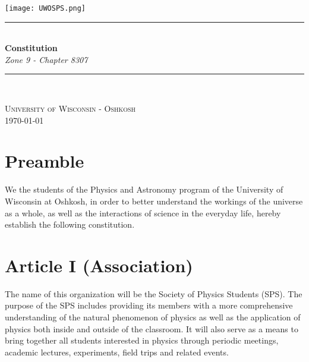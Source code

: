 \documentclass[12pt,a4paper]{article}
\newcommand{\HRule}{\rule{\linewidth}{0.5mm}}
\begin{document}
\setcounter{secnumdepth}{-6}
\begin{titlepage}
\begin{center}

\texttt{[image: UWOSPS.png]}


\HRule \\[0.4cm]
{ \LARGE 
  \textbf{Constitution}\\[0.4cm]
  \emph{Zone 9 - Chapter 8307}\\[0.4cm]
}
\HRule \\[1.5cm]


\vfill


\textsc{\large University of Wisconsin - Oshkosh}\\[0.4cm]


{\large \today}
 
\end{center}
\end{titlepage}


\tableofcontents
{}
\newpage
\setcounter{page}{1}

\section{Preamble}
We the students of the Physics and Astronomy program of the University of Wisconsin at Oshkosh, in order to better understand the workings of the universe as a whole, as well as the interactions of science in the everyday life, hereby establish the following constitution. 

\section{Article I (Association)}
The name of this organization will be the Society of Physics Students (SPS). The purpose of the SPS includes providing its members with a more comprehensive understanding of the natural phenomenon of physics as well as the application of physics both inside and outside of the classroom. It will also serve as a means to bring together all students interested in physics through periodic meetings, academic lectures, experiments, field trips and related events. 
\end{document}
